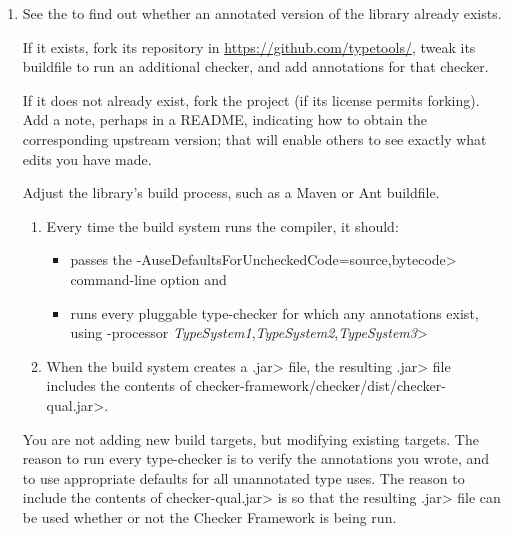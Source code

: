 \begin{enumerate}
\item See the
  to find out whether an annotated version of the library already exists.

  If it exists, fork its repository in \url{https://github.com/typetools/},
  tweak its buildfile to run an additional checker, and add annotations for
  that checker.

  If it does not already exist, fork the project (if its license permits
  forking).  Add a note, perhaps in a README, indicating how to obtain the
  corresponding upstream version; that will enable others to see exactly
  what edits you have made.

  Adjust the library's
  build process, such as a Maven or Ant buildfile.
  \begin{sloppypar}
  \begin{enumerate}
  \item
    Every time the build system runs the compiler, it should:
    \begin{itemize}
    \item
      passes the \<-AuseDefaultsForUncheckedCode=source,bytecode>
      command-line option and
    \item
      runs every pluggable type-checker for which any
      annotations exist, using \<-processor
      \emph{TypeSystem1},\emph{TypeSystem2},\emph{TypeSystem3}>
    \end{itemize}
  \item
    When the build system creates a \<.jar> file, the resulting \<.jar>
    file includes the contents of
    \<checker-framework/checker/dist/checker-qual.jar>.
  \end{enumerate}
  \end{sloppypar}

  You are not adding new build targets, but modifying existing targets.
  The reason to run every type-checker is to verify
  the annotations you wrote, and to use appropriate defaults for all
  unannotated type uses.
  The reason to include the contents of \<checker-qual.jar> is so that
  the resulting \<.jar> file can be used whether or not the Checker Framework
  is being run.


\end{enumerate}
